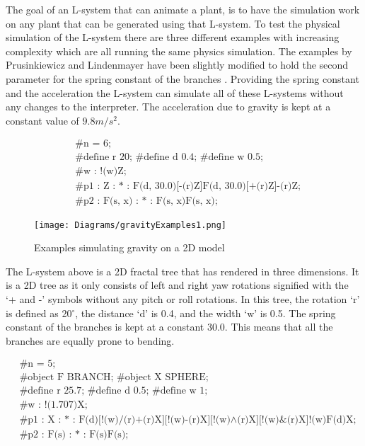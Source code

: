 The goal of an L-system that can animate a plant, is to have the simulation work on any plant that can be generated using that L-system. To test the physical simulation of the L-system there are three different examples with increasing complexity which are all running the same physics simulation. The examples by Prusinkiewicz and Lindenmayer have been slightly modified to hold the second parameter for the spring constant of the branches \cite{prusinkiewicz2012algorithmic}. Providing the spring constant and the acceleration the L-system can simulate all of these L-systems without any changes to the interpreter. The acceleration due to gravity is kept at a constant value of $9.8m/s^2$.

\begin{singlespace}
\begin{equation}
\begin{aligned}
	&\textrm{\#n = 6;} \\
	&\textrm{\#define r 20; \#define d 0.4; \#define w 0.5;}\\
	&\textrm{\#w : !(w)Z;}\\
	&\textrm{\#p1 : Z : * : F(d, 30.0)[-(r)Z]F(d, 30.0)[+(r)Z]-(r)Z;}\\
	&\textrm{\#p2 : F(s, x) : * : F(s, x)F(s, x);}
\end{aligned}
\end{equation}
\end{singlespace}

\begin{figure}[htbp]
	{\centering
		\vspace{7px}
		\texttt{[image: Diagrams/gravityExamples1.png]}
		\label{3DAxisFigure} \label{Gravity applied to generated models}
		\caption{Examples simulating gravity on a 2D model}
	}
\end{figure}
\FloatBarrier

The L-system above is a 2D fractal tree that has rendered in three dimensions. It is a 2D tree as it only consists of left and right yaw rotations signified with the `+ and -' symbols without any pitch or roll rotations. In this tree, the rotation `r' is defined as 20$^{\circ}$, the distance `d' is 0.4, and the width `w' is 0.5. The spring constant of the branches is kept at a constant 30.0. This means that all the branches are equally prone to bending. 

\begin{singlespace}
\begin{equation}
\begin{aligned}
	&\textrm{\#n = 5;} \\
	&\textrm{\#object F BRANCH; \#object X SPHERE;}\\
	&\textrm{\#define r 25.7; \#define d 0.5; \#define w 1;}\\
	&\textrm{\#w : !(1.707)X;}\\
	&\textrm{\#p1 : X : * : F(d)[!(w)/(r)+(r)X][!(w)-(r)X][!(w)$\land$(r)X][!(w)\&(r)X]!(w)F(d)X;}\\
	&\textrm{\#p2 : F(s) : * : F(s)F(s);}
\end{aligned}
\end{equation}
\end{singlespace}

